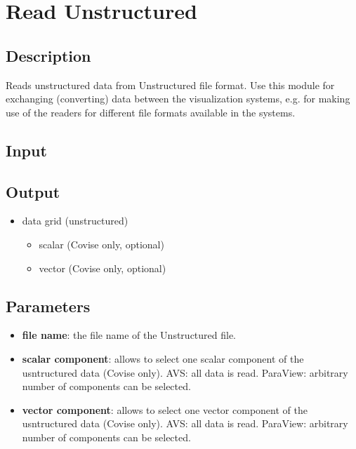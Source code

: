 \section{Read Unstructured}
\label{sec:read-unstructured}


\subsection{Description}
Reads unstructured data from Unstructured file format. Use this module for exchanging (converting) data between the visualization systems, e.g. for making use of the readers for different file formats available in the systems.


\subsection{Input}


\subsection{Output}
\begin{itemize}
\item
  data grid (unstructured)
  \begin{itemize}
  \item
    scalar (Covise only, optional)
  \item
    vector (Covise only, optional)
  \end{itemize}
\end{itemize}


\subsection{Parameters}
\begin{itemize}

\item
  \textbf{file name}: the file name of the Unstructured file.

\item
  \textbf{scalar component}: allows to select one scalar component of the usntructured data (Covise only). AVS: all data is read. ParaView: arbitrary number of components can be selected.

\item
  \textbf{vector component}: allows to select one vector component of the usntructured data (Covise only). AVS: all data is read. ParaView: arbitrary number of components can be selected.

\end{itemize}


